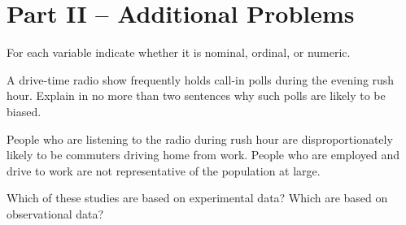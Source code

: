 \documentclass[addpoints,12pt]{exam}
\begin{document}
\section*{Part II -- Additional Problems}
\begin{questions}

\question For each variable indicate whether it is nominal, ordinal, or numeric.
	

	
\question A drive-time radio show frequently holds call-in polls during the evening rush hour. Explain in no more than two sentences why such polls are likely to be biased.
	\begin{solution}
		People who are listening to the radio during rush hour are disproportionately likely to be commuters driving home from work. People who are employed and drive to work are not representative of the population at large.  
	\end{solution}

	
\question Which of these studies are based on experimental data? Which are based on observational data?
\end{questions}
\end{document}

